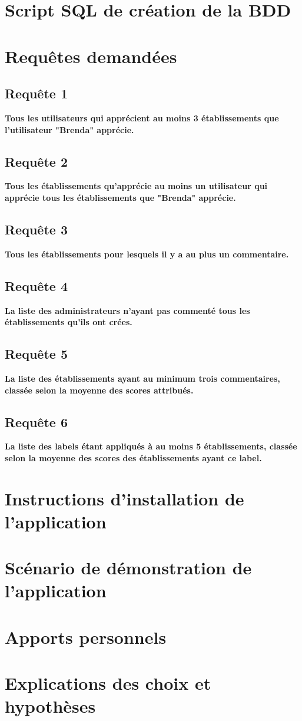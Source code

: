 \documentclass[a4paper,10pt]{article}
\begin{document}
\section{Script SQL de création de la BDD}

\section{Requêtes demandées}

\subsection{Requête 1}

\textbf{Tous les utilisateurs qui apprécient au moins 3 établissements que l’utilisateur "Brenda" apprécie.}

\subsection{Requête 2}

\textbf{Tous les établissements qu’apprécie au moins un utilisateur qui apprécie tous les établissements que "Brenda" apprécie.}

\subsection{Requête 3}

\textbf{Tous les établissements pour lesquels il y a au plus un commentaire.}

\subsection{Requête 4}

\textbf{La liste des administrateurs n’ayant pas commenté tous les établissements qu’ils ont crées.}

\subsection{Requête 5}

\textbf{La liste des établissements ayant au minimum trois commentaires, classée selon la moyenne des scores attribués.}

\subsection{Requête 6}

\textbf{La liste des labels étant appliqués à au moins 5 établissements, classée selon la moyenne des scores des établissements ayant ce label.}

\section{Instructions d'installation de l'application}

\section{Scénario de démonstration de l'application}

\section{Apports personnels}

\section{Explications des choix et hypothèses}
\end{document}
